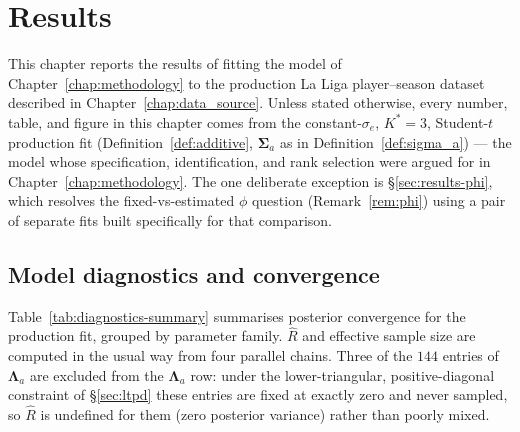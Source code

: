 \chapter{Results} \label{chap:results}

This chapter reports the results of fitting the model of Chapter~\ref{chap:methodology} to the production
La Liga player--season dataset described in Chapter~\ref{chap:data_source}. Unless stated otherwise, every
number, table, and figure in this chapter comes from the constant-$\sigma_e$, $K^*=3$, Student-$t$ production
fit (Definition~\ref{def:additive}, $\boldsymbol\Sigma_a$ as in Definition~\ref{def:sigma_a}) --- the model
whose specification, identification, and rank selection were argued for in Chapter~\ref{chap:methodology}. The
one deliberate exception is \S\ref{sec:results-phi}, which resolves the fixed-vs-estimated $\phi$ question
(Remark~\ref{rem:phi}) using a pair of separate fits built specifically for that comparison.

\section{Model diagnostics and convergence}
\label{sec:results-diagnostics}

Table~\ref{tab:diagnostics-summary} summarises posterior convergence for the production fit, grouped by
parameter family. $\hat R$ and effective sample size are computed in the usual way from four parallel chains.
Three of the $144$ entries of $\boldsymbol\Lambda_a$ are excluded from the $\boldsymbol\Lambda_a$ row: under the
lower-triangular, positive-diagonal constraint of \S\ref{sec:ltpd} these entries are fixed at exactly zero and
never sampled, so $\hat R$ is undefined for them (zero posterior variance) rather than poorly mixed.

\begin{table}[h]
\centering
\caption{Posterior convergence summary for the production fit ($K^*=3$), by parameter family. $\nu$ is the
Student-$t$ degrees of freedom (Definition~\ref{def:student_t}); $\boldsymbol\Lambda_a$, $\boldsymbol\Psi_a$
are the factor loadings and uniqueness (Definition~\ref{def:sigma_a}); $\boldsymbol\sigma_b,\boldsymbol\sigma_e$
are the season and residual scales. The $[\boldsymbol\Lambda_a\boldsymbol\Lambda_a^\top]_{1,10}$ row is the
rotation-invariant bellwether check discussed below.}
\label{tab:diagnostics-summary}
\small

\end{table}

